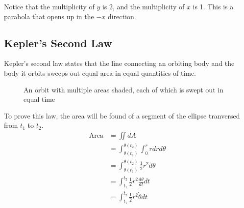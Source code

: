 \documentclass{article}
\begin{document}
Notice that the multiplicity of $y$ is 2, and the multiplicity of $x$ is 1. This is a parabola that opens up in the $-x$ direction.

\bigskip\bigskip
\subsection{Kepler's Second Law}

Kepler's second law states that the line connecting an orbiting body and the body it orbits sweeps out equal area in equal quantities of time.
\begin{figure}[H]
    \centering

    \caption{An orbit with multiple areas shaded, each of which is swept out in equal time}
\end{figure}

To prove this law, the area will be found of a segment of the ellipse tranversed from $t_1$ to $t_2$.
\begin{align*}
    \text{Area} & =\iint{}dA                                               \\
                & = \int_{\theta(t_1)}^{\theta(t_2)}\int_{0}^{r}rdrd\theta \\
                & = \int_{\theta(t_1)}^{\theta(t_2)}\frac{1}{2}r^2d\theta  \\
                & = \int_{t_1}^{t_2}\frac{1}{2}r^2\frac{d\theta}{dt}dt     \\
                & = \int_{t_1}^{t_2}\frac{1}{2}r^2\dot{\theta}dt           \\
\end{align*}
\end{document}
